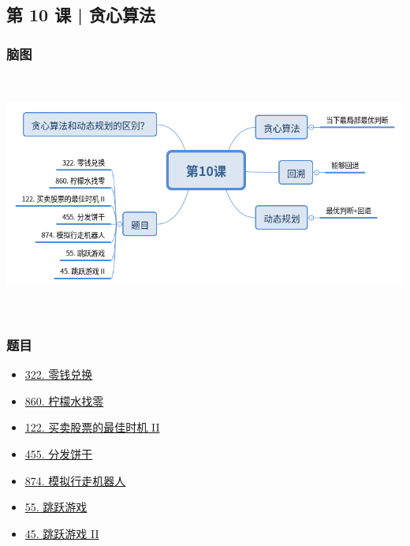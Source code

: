 \subsection{第 10 课 | 贪心算法}

\subsubsection{脑图}

\includegraphics[width=170mm,height=80mm]{images/第10课.png}

\subsubsection{题目}

\begin{itemize}
  \item \hyperref[leetcode:322]{322. 零钱兑换}
  \item \hyperref[leetcode:860]{860. 柠檬水找零}
  \item \hyperref[leetcode:122]{122. 买卖股票的最佳时机 II}
  \item \hyperref[leetcode:455]{455. 分发饼干}
  \item \hyperref[leetcode:874]{874. 模拟行走机器人}
  \item \hyperref[leetcode:55]{55. 跳跃游戏}
  \item \hyperref[leetcode:45]{45. 跳跃游戏 II}
\end{itemize}

